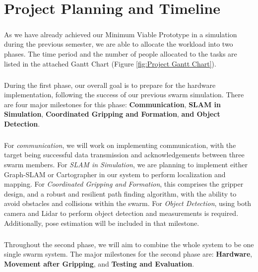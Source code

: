 \chapter{Project Planning and Timeline}

\paragraph*{}
As we have already achieved our Minimum Viable Prototype in a simulation during the previous semester, we are able to allocate the workload into two phases. The time period and the number of people allocated to the tasks are listed in the attached Gantt Chart (Figure \ref{fig:Project Gantt Chart}).

\paragraph*{}
During the first phase, our overall goal is to prepare for the hardware implementation, following the success of our previous swarm simulation. There are four major milestones for this phase: \textbf{Communication}, \textbf{SLAM in Simulation}, \textbf{Coordinated Gripping and Formation}, \textbf{and Object Detection}. 

\paragraph*{}
For \textit{communication}, we will work on implementing communication, with the target being successful data transmission and acknowledgements between three swarm members. For \textit{SLAM in Simulation}, we are planning to implement either Graph-SLAM or Cartographer in our system to perform localization and mapping. For \textit{Coordinated Gripping and Formation}, this comprises the gripper design, and a robust and resilient path finding algorithm, with the ability to avoid obstacles and collisions within the swarm. For \textit{Object Detection}, using both camera and Lidar to perform object detection and measurements is required. Additionally, pose estimation will be included in that milestone.

\paragraph*{}
Throughout the second phase, we will aim to combine the whole system to be one single swarm system. The major milestones for the second phase are: \textbf{Hardware}, \textbf{Movement after Gripping}, and \textbf{Testing and Evaluation}.

